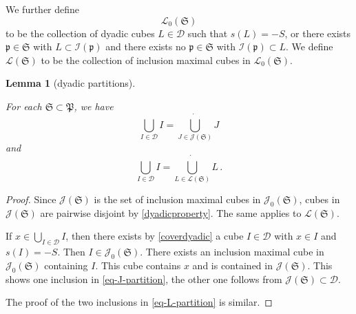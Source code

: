 \documentclass[10pt,a4paper]{article}
\theoremstyle{plain}
\newtheorem{lemma}[theorem]{Lemma}
\theoremstyle{definition}
\numberwithin{equation}{subsection}
\newcommand{\fp}{{\mathfrak p}}
\newcommand{\fP}{{\mathfrak P}}
\newcommand{\scI}{{\mathcal{I}}} %
\newcommand{\lean}[1]{}
\newcommand{\leanok}{}
\begin{document}
We further define
$$
    \mathcal{L}_0(\mathfrak{S})
$$
to be the collection of dyadic cubes $L \in \mathcal{D}$ such that $s(L) = -S$, or there exists $\fp \in \mathfrak{S}$ with $L \subset \scI(\fp)$ and there exists no $\fp \in \mathfrak{S}$ with $\scI(\fp) \subset L$. We define $\mathcal{L}(\mathfrak{S})$ to be the collection of inclusion maximal cubes in $\mathcal{L}_0(\mathfrak{S})$.

\begin{lemma}[dyadic partitions]
    \label{dyadic-partitions}
    \leanok
    \lean{TileStructure.Forest.biUnion_𝓙, TileStructure.Forest.pairwiseDisjoint_𝓙,
    TileStructure.Forest.biUnion_𝓛, TileStructure.Forest.pairwiseDisjoint_𝓛}
    For each $\mathfrak{S} \subset \fP$, we have
    \begin{equation}
        \label{eq-J-partition}
        \bigcup_{I \in \mathcal{D}} I = \dot{\bigcup_{J \in \mathcal{J}(\mathfrak{S})}} J
    \end{equation}
    and
    \begin{equation}
        \label{eq-L-partition}
        \bigcup_{I \in \mathcal{D}} I = \dot{\bigcup_{L \in \mathcal{L}(\mathfrak{S})}} L\,.
    \end{equation}
\end{lemma}

\begin{proof}
    \leanok
    Since $\mathcal{J}(\mathfrak{S})$ is the set of inclusion maximal cubes in $\mathcal{J}_0(\mathfrak{S})$, cubes in $\mathcal{J}(\mathfrak{S})$ are pairwise disjoint by \eqref{dyadicproperty}. The same applies to $\mathcal{L}(\mathfrak{S})$.

    If $x \in \bigcup_{I \in \mathcal{D}} I$, then there exists by \eqref{coverdyadic} a cube $I \in \mathcal{D}$ with $x \in I$ and $s(I) = -S$. Then $I \in \mathcal{J}_0(\mathfrak{S})$. There exists an inclusion maximal cube in $\mathcal{J}_0(\mathfrak{S})$ containing $I$. This cube contains $x$ and is contained in $\mathcal{J}(\mathfrak{S})$. This shows one inclusion in \eqref{eq-J-partition}, the other one follows from $\mathcal{J}(\mathfrak{S}) \subset \mathcal{D}$.

    The proof of the two inclusions in \eqref{eq-L-partition} is similar.
\end{proof}
\end{document}
